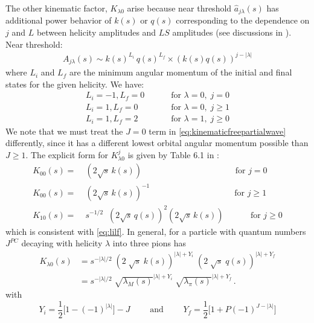 \documentclass[10pt, aps,prd,amsmath,amssymb,superscriptaddress,onecolumn,
nofootinbib,showpacs,preprintnumbers]{revtex4-1}
\newcommand{\mand}{\qquad \text{ and } \qquad}
\begin{document}
The other kinematic factor, \(K_{\lambda0}\) arise  because near threshold \(\hat{a}_{j\lambda}(s)\) has additional power behavior of \(k(s)\) or \(q(s)\) corresponding to the dependence on \(j\) and \(L\) between helicity amplitudes and \(LS\) amplitudes (see discussions in \cite{Jackson1968,Franklin1966}). Near threshold:
  \begin{gather}
    A_{j\lambda}(s) \sim k(s)^{L_i} \, q(s)^{L_f} \times (k(s)q(s))^{j- |\lambda|}
  \end{gather}
where \(L_i\) and \(L_f\) are the minimum angular momentum of the initial and final states for the given helicity. We have:
  \begin{align}
      L_i = -1, L_f = 0 &\qquad  \text{ for } \lambda = 0, \; j = 0   \nonumber \\
      L_i = 1, L_f = 0 &\qquad  \text{ for } \lambda = 0, \;  j \label{eq:lilf} \geq 1  \\
      L_i = 1 , L_f = 2& \qquad  \text{ for } \lambda = 1, \; j \geq 0 \nonumber
  \end{align}
We note that we must treat the \(J=0\) term in \cref{eq:kinematicfreepartialwave} differently, since it has a different lowest orbital angular momentum possible than \(J\geq 1\). The explicit form for \(K^j_{\lambda0}\) is given by Table 6.1 in \cite{Collins}:
  \begin{align}
    \label{eq:k-factor}
    K_{00}(s) =& \;  ( 2\sqrt{s} \, k(s)) \qquad \qquad \qquad \quad \; \, \; \qquad \quad
    \text{  for } j=0 \nonumber \\
    K_{00 }(s) =& \; ( 2\sqrt{s} \, k(s))^{-1} \qquad \qquad \qquad \quad \qquad \quad
    \text{for } j\geq 1\\ \nonumber
    K_{10}(s) =& \; s^{-1/2} \;\; (2  \sqrt{s} \, q(s))^2  (2  \sqrt{s} \, k(s)) \qquad \; \; \;\text{ for } j\geq 0
  \end{align}
which is consistent with \cref{eq:lilf}. In general, for a particle with quantum numbers \(J^{PC}\) decaying with helicity \(\lambda\) into three pions has
  \begin{align}
    K_{\lambda 0}(s) &=  s^{-|\lambda|/2} \; (2 \; \sqrt{s} \; k(s))^{|\lambda| + Y_i} \; (2 \; \sqrt{s} \; q(s))^{|\lambda| + Y_f} \nonumber \\
    &=  s^{-|\lambda|/2} \; \sqrt{\lambda_M(s)}^{|\lambda| + Y_i} \; \sqrt{\lambda_\pi(s)}^{|\lambda| + Y_f}\, .
  \end{align}
with
  \begin{equation}
    Y_i =  \frac{1}{2} \big[ 1 - (-1)^{|\lambda|}\big] - J \mand Y_f =  \frac{1}{2} \big[ 1 + P (-1)^{J- |\lambda|}]
  \end{equation}
\end{document}
